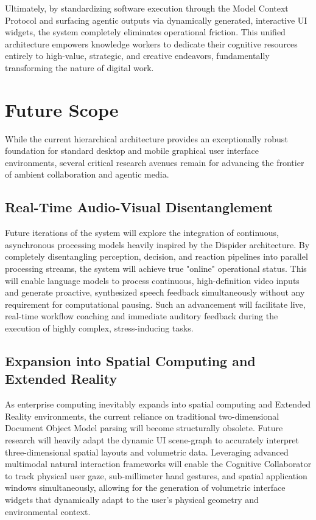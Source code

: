 \documentclass[12pt, a4paper]{report}
\begin{document}
Ultimately, by standardizing software execution through the Model Context Protocol and surfacing agentic outputs via dynamically generated, interactive UI widgets, the system completely eliminates operational friction. This unified architecture empowers knowledge workers to dedicate their cognitive resources entirely to high-value, strategic, and creative endeavors, fundamentally transforming the nature of digital work.\cite{hojo2025}

\section{Future Scope}
While the current hierarchical architecture provides an exceptionally robust foundation for standard desktop and mobile graphical user interface environments, several critical research avenues remain for advancing the frontier of ambient collaboration and agentic media.

\subsection{Real-Time Audio-Visual Disentanglement}
Future iterations of the system will explore the integration of continuous, asynchronous processing models heavily inspired by the Dispider architecture.\cite{hojo2025} By completely disentangling perception, decision, and reaction pipelines into parallel processing streams, the system will achieve true "online" operational status. This will enable language models to process continuous, high-definition video inputs and generate proactive, synthesized speech feedback simultaneously without any requirement for computational pausing.\cite{hojo2025} Such an advancement will facilitate live, real-time workflow coaching and immediate auditory feedback during the execution of highly complex, stress-inducing tasks.

\subsection{Expansion into Spatial Computing and Extended Reality}
As enterprise computing inevitably expands into spatial computing and Extended Reality environments, the current reliance on traditional two-dimensional Document Object Model parsing will become structurally obsolete.\cite{hojo2025} Future research will heavily adapt the dynamic UI scene-graph to accurately interpret three-dimensional spatial layouts and volumetric data. Leveraging advanced multimodal natural interaction frameworks will enable the Cognitive Collaborator to track physical user gaze, sub-millimeter hand gestures, and spatial application windows simultaneously, allowing for the generation of volumetric interface widgets that dynamically adapt to the user's physical geometry and environmental context.\cite{hojo2025}
\end{document}
